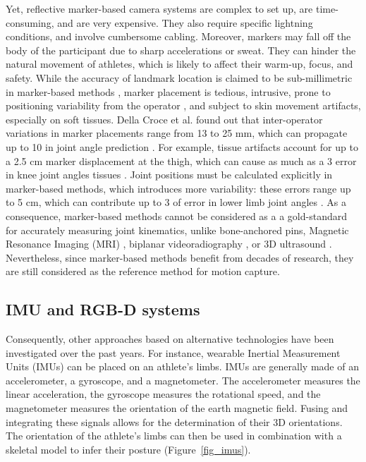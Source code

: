 Yet, reflective marker-based camera systems are complex to set up, are time-consuming, and are very expensive. They also require specific lightning conditions, and involve cumbersome cabling. Moreover, markers may fall off the body of the participant due to sharp accelerations or sweat. They can hinder the natural movement of athletes, which is likely to affect their warm-up, focus, and safety. While the accuracy of landmark location is claimed to be sub-millimetric in marker-based methods \cite{Topley2020}, marker placement is tedious, intrusive, prone to positioning variability from the operator \cite{Tsushima2003}, and subject to skin movement artifacts, especially on soft tissues. Della Croce et al. found out that inter-operator variations in marker placements range from 13 to 25 mm, which can propagate up to 10\degree{} in joint angle prediction \cite{Gorton2009,Croce1999}. For example, tissue artifacts account for up to a 2.5 cm marker displacement at the thigh, which can cause as much as a 3\degree{} error in knee joint angles tissues \cite{Benoit2015,Cappozzo1995}. Joint positions must be calculated explicitly in marker-based methods, which introduces more variability: these errors range up to 5 cm, which can contribute up to 3\degree{} of error in lower limb joint angles \cite{Leboeuf2019}. As a consequence, marker-based methods cannot be considered as a a gold-standard for accurately measuring joint kinematics, unlike bone-anchored pins, Magnetic Resonance Imaging (MRI) \cite{Yahia2004}, biplanar videoradiography \cite{Miranda2013, Kessler2019}, or 3D ultrasound \cite{Peters2010}. Nevertheless, since marker-based methods benefit from decades of research, they are still considered as the reference method for motion capture.


\FloatBarrier
\subsection{IMU and RGB-D systems}

Consequently, other approaches based on alternative technologies have been investigated over the past years. For instance, wearable Inertial Measurement Units (IMUs) can be placed on an athlete's limbs. IMUs are generally made of an accelerometer, a gyroscope, and a magnetometer. The accelerometer measures the linear acceleration, the gyroscope measures the rotational speed, and the magnetometer measures the orientation of the earth magnetic field. Fusing and integrating these signals allows for the determination of their 3D orientations. The orientation of the athlete's limbs can then be used in combination with a skeletal model to infer their posture (Figure~\ref{fig_imus}).

